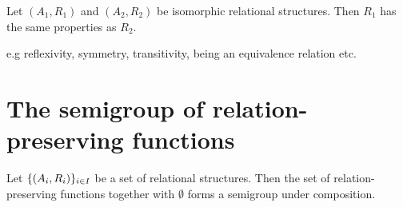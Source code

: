 \begin{lemma}
Let $(A_1, R_1)$ and $(A_2, R_2)$ be isomorphic relational structures. Then $R_1$ has the same properties as $R_2$.
\end{lemma}
e.g\: reflexivity, symmetry, transitivity, being an equivalence relation etc.


\section{The semigroup of relation-preserving functions}
\begin{lemma}
Let $\{\sSet{A_i, R_i}\}_{i\in I}$ be a set of relational structures. Then the set of relation-preserving functions together with $\emptyset$ forms a semigroup under composition.
\end{lemma}


